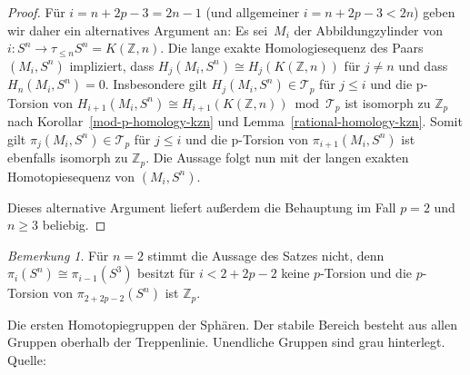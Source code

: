 \documentclass[11pt, a4paper, german]{article}
\theoremstyle{definition}
\theoremstyle{remark}
\newtheorem*{bem}{Bemerkung}
\newcommand{\Z}{\mathbb{Z}} %
\newcommand{\T}{\mathcal{T}} %
\begin{document}
\begin{proof}
  Für $i = n + 2p - 3 = 2n - 1$ (und allgemeiner $i = n + 2p - 3 < 2n$) geben wir daher ein alternatives Argument an:
  Es sei~$M_i$ der Abbildungzylinder von $i : S^n \to \tau_{\leq n} S^n = K(\Z, n)$.
  Die lange exakte Homologiesequenz des Paars $(M_i, S^n)$ impliziert, dass $H_j(M_i, S^n) \cong H_j(K(\Z, n))$ für $j \neq n$ und dass $H_n(M_i, S^n) = 0$.
  Insbesondere gilt $H_j(M_i, S^n) \in \T_p$ für $j \leq i$ und die p-Torsion von $H_{i+1}(M_i, S^n) \cong H_{i+1}(K(\Z, n)) \bmod{\T_p}$ ist isomorph zu $\Z_p$  nach Korollar~\ref{mod-p-homology-kzn} und Lemma~\ref{rational-homology-kzn}.
  Somit gilt $\pi_j(M_i, S^n) \in \T_p$ für $j \leq i$ und die p-Torsion von $\pi_{i+1}(M_i, S^n)$ ist ebenfalls isomorph zu $\Z_p$.
  Die Aussage folgt nun mit der langen exakten Homotopiesequenz von $(M_i, S^n)$.
  
  Dieses alternative Argument liefert außerdem die Behauptung im Fall $p=2$ und $n \geq 3$ beliebig.
\end{proof}

\begin{bem}
  Für $n=2$ stimmt die Aussage des Satzes nicht, denn
  $\pi_i(S^n) \cong \pi_{i-1}(S^3)$ besitzt für $i < 2 + 2p - 2$ keine $p$-Torsion und die $p$-Torsion von $\pi_{2 + 2p - 2}(S^n)$ ist $\Z_p$.
\end{bem}

\nocite{*}
\printbibliography

\newpage
{}
\begin{landscape}
  \begin{center}
    \mbox{}\vspace{8em}
    \begin{table}
      \footnotesize \setlength\extrarowheight{5pt}
      
      \caption{Die ersten Homotopiegruppen der Sphären. Der stabile Bereich besteht aus allen Gruppen oberhalb der Treppenlinie. Unendliche Gruppen sind grau hinterlegt. Quelle: \cite{toda:composition}}
    \end{table}
  \end{center}
\end{landscape}

\end{document}
